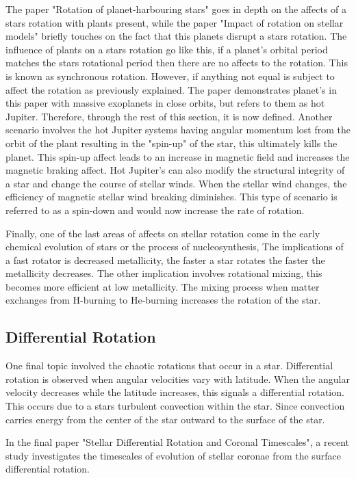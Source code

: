 \documentclass[a4paper, 12pt]{article}
\begin{document}
The paper "Rotation of planet-harbouring stars" goes in depth on the affects of a stars rotation with plants present, while the paper "Impact of rotation on stellar models" briefly touches on the fact that this planets disrupt a stars rotation. The influence of plants on a stars rotation go like this, if a planet's orbital period matches the stars rotational period then there are no affects to the rotation. This is known as synchronous rotation. However, if anything not equal is subject to affect the rotation as previously explained. The paper demonstrates planet's in this paper with massive exoplanets in close orbits, but refers to them as hot Jupiter. Therefore, through the rest of this section, it is now defined. Another scenario involves the hot Jupiter systems having angular momentum lost from the orbit of the plant resulting in the "spin-up" of the star, this ultimately kills the planet. This spin-up affect leads to an increase in magnetic field and increases the magnetic braking affect. Hot Jupiter's can also modify the structural integrity of a star and change the course of stellar winds. When the stellar wind changes, the efficiency of magnetic stellar wind breaking diminishes. This type of scenario is referred to as a spin-down and would now increase the rate of rotation. 

Finally, one of the last areas of affects on stellar rotation come in the early chemical evolution of stars or the process of nucleosynthesis, The implications of a fast rotator is decreased metallicity, the faster a star rotates the faster the metallicity decreases. The other implication involves rotational mixing, this becomes more efficient at low metallicity. The mixing process when matter exchanges from H-burning to He-burning increases the rotation of the star.

\subsection{Differential Rotation}

One final topic involved the chaotic rotations that occur in a star. Differential rotation is observed when angular velocities vary with latitude. When the angular velocity decreases while the latitude increases, this signals a differential rotation. This occurs due to a stars turbulent convection within the star. Since convection carries energy from the center of the star outward to the surface of the star. 

In the final paper "Stellar Differential Rotation and Coronal Timescales", a recent study investigates the timescales of evolution of stellar coronae from the surface differential rotation. 
\end{document}
